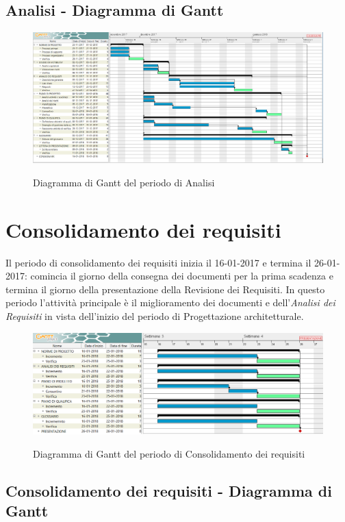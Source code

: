 \documentclass[PianoDiProgetto.tex]{subfiles}
\begin{document}
\begin{landscape}
	\subsection{Analisi - Diagramma di Gantt}
	\begin{figure}[ht]	
		\includegraphics[width=20.5cm]{images/gantt/analisi.png}
		\label{fig:foo}
		\caption{Diagramma di Gantt del periodo di Analisi}		
	\end{figure}			
\end{landscape}	

\section{Consolidamento dei requisiti}
Il periodo di consolidamento dei requisiti inizia il 16-01-2017 e termina il 26-01-2017: comincia il giorno della consegna dei documenti per la prima scadenza e termina il giorno della presentazione della Revisione dei Requisiti. In questo periodo l'attività principale è il miglioramento dei documenti e dell'\textit{Analisi dei Requisiti} in vista dell'inizio del periodo di Progettazione architetturale.
\begin{figure}[ht]
	\includegraphics[width=14cm]{images/gantt/consolidamento.png}
	\label{fig:foo}
	\caption{Diagramma di Gantt del periodo di Consolidamento dei requisiti}
\end{figure}		
\subsection{Consolidamento dei requisiti - Diagramma di Gantt}
\end{document}
